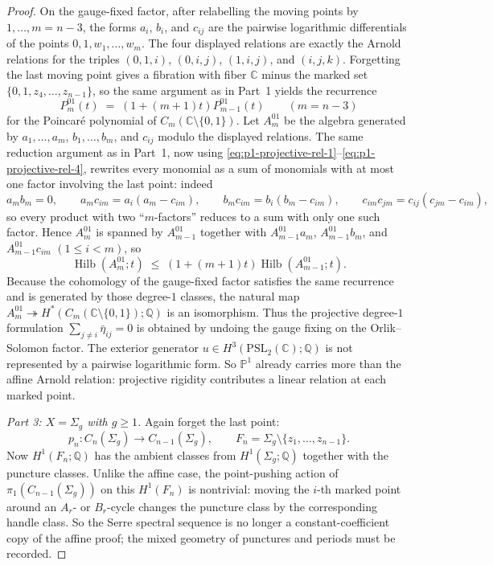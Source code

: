 \begin{proof}
On the gauge-fixed factor, after relabelling the moving points by
$1,\ldots,m=n-3$, the forms $a_i$, $b_i$, and $c_{ij}$ are the pairwise
logarithmic differentials of the points
$0,1,w_1,\ldots,w_m$. The four displayed relations are exactly the
Arnold relations for the triples $(0,1,i)$, $(0,i,j)$, $(1,i,j)$, and
$(i,j,k)$. Forgetting the last moving point gives a fibration with fiber
$\mathbb{C}$ minus the marked set $\{0,1,z_4,\ldots,z_{n-1}\}$, so the
same argument as in Part~1 yields the recurrence
\[
P_m^{01}(t)
\;=\;
(1+(m+1)t)P_{m-1}^{01}(t)
\qquad
(m=n-3)
\]
for the Poincar\'e polynomial of
$C_m(\mathbb{C}\setminus\{0,1\})$.
Let $A_m^{01}$ be the algebra generated by
$a_1,\ldots,a_m$, $b_1,\ldots,b_m$, and $c_{ij}$ modulo the displayed
relations. The same reduction argument as in Part~1, now using
\eqref{eq:p1-projective-rel-1}--\eqref{eq:p1-projective-rel-4}, rewrites
every monomial as a sum of monomials with at most one factor involving
the last point: indeed
\[
a_m b_m = 0,\qquad
a_m c_{im} = a_i(a_m-c_{im}),\qquad
b_m c_{im} = b_i(b_m-c_{im}),\qquad
c_{im}c_{jm} = c_{ij}(c_{jm}-c_{im}),
\]
so every product with two ``$m$-factors'' reduces to a sum with only one
such factor. Hence
$A_m^{01}$ is spanned by
$A_{m-1}^{01}$ together with
$A_{m-1}^{01}a_m$, $A_{m-1}^{01}b_m$, and
$A_{m-1}^{01}c_{im}$ $(1\leq i<m)$, so
\[
\operatorname{Hilb}(A_m^{01};t)
\;\leq\;
(1+(m+1)t)\operatorname{Hilb}(A_{m-1}^{01};t).
\]
Because the cohomology of the gauge-fixed factor satisfies the same
recurrence and is generated by those degree-$1$ classes, the natural map
$A_m^{01}\twoheadrightarrow
H^*(C_m(\mathbb{C}\setminus\{0,1\});\mathbb{Q})$
is an isomorphism. Thus the projective degree-$1$ formulation
$\sum_{j\neq i}\bar\eta_{ij}=0$ is obtained by undoing the gauge fixing
on the Orlik--Solomon factor. The exterior generator
$u\in H^3(\mathrm{PSL}_2(\mathbb{C});\mathbb{Q})$ is not represented by
a pairwise logarithmic form. So $\mathbb{P}^1$ already carries more
than the affine Arnold relation:
projective rigidity contributes a linear relation at each marked point.

\emph{Part 3: $X=\Sigma_g$ with $g\geq 1$.}
Again forget the last point:
\[
p_n\colon C_n(\Sigma_g)\to C_{n-1}(\Sigma_g),
\qquad
F_n=\Sigma_g\setminus\{z_1,\ldots,z_{n-1}\}.
\]
Now
$H^1(F_n;\mathbb{Q})$
has the ambient classes from $H^1(\Sigma_g;\mathbb{Q})$ together with
the puncture classes. Unlike the affine case, the point-pushing action
of $\pi_1(C_{n-1}(\Sigma_g))$ on this $H^1(F_n)$ is nontrivial: moving
the $i$-th marked point around an $A_r$- or $B_r$-cycle changes the
puncture class by the corresponding handle class. So the Serre spectral
sequence is no longer a constant-coefficient copy of the affine proof;
the mixed geometry of punctures and periods must be recorded.


\end{proof}
